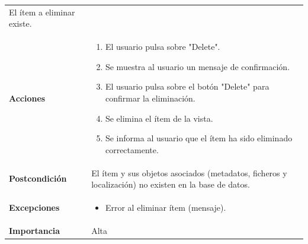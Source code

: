 \documentclass[
]{article}
\providecommand{\tightlist}{%
  \setlength{\itemsep}{0pt}\setlength{\parskip}{0pt}}
\begin{document}
\begin{longtable}[]{@{}ll@{}}
\begin{minipage}[t]{0.74\columnwidth}
El ítem a eliminar existe.\strut
\end{minipage}\tabularnewline
\begin{minipage}[t]{0.20\columnwidth}\raggedright
\textbf{Acciones}\strut
\end{minipage} & \begin{minipage}[t]{0.74\columnwidth}\raggedright
\begin{enumerate}
\def\labelenumi{\arabic{enumi}.}
\tightlist
\item
  El usuario pulsa sobre "Delete".
\item
  Se muestra al usuario un mensaje de confirmación.
\item
  El usuario pulsa sobre el botón "Delete" para confirmar la
  eliminación.
\item
  Se elimina el ítem de la vista.
\item
  Se informa al usuario que el ítem ha sido eliminado correctamente.
\end{enumerate}\strut
\end{minipage}\tabularnewline
\begin{minipage}[t]{0.20\columnwidth}\raggedright
\textbf{Postcondición}\strut
\end{minipage} & \begin{minipage}[t]{0.74\columnwidth}\raggedright
El ítem y sus objetos asociados (metadatos, ficheros y localización) no
existen en la base de datos.\strut
\end{minipage}\tabularnewline
\begin{minipage}[t]{0.20\columnwidth}\raggedright
\textbf{Excepciones}\strut
\end{minipage} & \begin{minipage}[t]{0.74\columnwidth}\raggedright
\begin{itemize}
\tightlist
\item
  Error al eliminar ítem (mensaje).
\end{itemize}\strut
\end{minipage}\tabularnewline
\begin{minipage}[t]{0.20\columnwidth}\raggedright
\textbf{Importancia}\strut
\end{minipage} & \begin{minipage}[t]{0.74\columnwidth}\raggedright
Alta\strut
\end{minipage}\tabularnewline
\bottomrule
\end{longtable}
\end{document}
